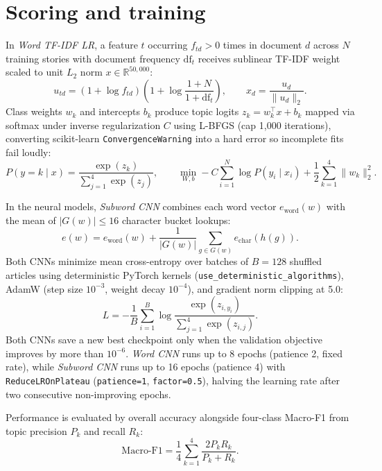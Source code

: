 \section{Scoring and training}
\begingroup
\setlength{\abovedisplayskip}{5pt}
\setlength{\belowdisplayskip}{5pt}
In \textit{Word TF-IDF LR}, a feature $t$ occurring $f_{td} > 0$ times in document $d$ across $N$ training stories with document frequency $\mathrm{df}_t$ receives sublinear TF-IDF weight scaled to unit $L_2$ norm $x \in \mathbb{R}^{50{,}000}$:
\begin{equation}
u_{td} = (1 + \log f_{td})\!\left(1 + \log \frac{1 + N}{1 + \mathrm{df}_t}\right), \qquad x_d = \frac{u_d}{\|u_d\|_2}.
\end{equation}
Class weights $w_k$ and intercepts $b_k$ produce topic logits $z_k = w_k^\top x + b_k$ mapped via softmax under inverse regularization $C$ using L-BFGS (cap 1,000 iterations), converting scikit-learn \texttt{ConvergenceWarning} into a hard error so incomplete fits fail loudly:
\begin{equation}
P(y = k \mid x) = \frac{\exp(z_k)}{\sum_{j=1}^{4}\exp(z_j)}, \qquad \min_{W,b} -C\sum_{i=1}^{N}\log P(y_i \mid x_i) + \frac{1}{2}\sum_{k=1}^{4}\|w_k\|_2^2.
\end{equation}

In the neural models, \textit{Subword CNN} combines each word vector $e_{\mathrm{word}}(w)$ with the mean of $|G(w)| \le 16$ character bucket lookups:
\begin{equation}
e(w) = e_{\mathrm{word}}(w) + \frac{1}{|G(w)|}\sum_{g \in G(w)} e_{\mathrm{char}}(h(g)).
\end{equation}
Both CNNs minimize mean cross-entropy over batches of $B = 128$ shuffled articles using deterministic PyTorch kernels (\texttt{use\_deterministic\_algorithms}), AdamW \citep{adamw} (step size $10^{-3}$, weight decay $10^{-4}$), and gradient norm clipping at 5.0:
\begin{equation}
L = -\frac{1}{B}\sum_{i=1}^{B} \log \frac{\exp(z_{i, y_i})}{\sum_{j=1}^{4}\exp(z_{i,j})}.
\end{equation}
Both CNNs save a new best checkpoint only when the validation objective improves by more than $10^{-6}$. \textit{Word CNN} runs up to 8 epochs (patience 2, fixed rate), while \textit{Subword CNN} runs up to 16 epochs (patience 4) with \texttt{ReduceLROnPlateau} (\texttt{patience=1}, \texttt{factor=0.5}), halving the learning rate after two consecutive non-improving epochs.

Performance is evaluated by overall accuracy alongside four-class Macro-F1 from topic precision $P_k$ and recall $R_k$:
\begin{equation}
\text{Macro-F1} = \frac{1}{4}\sum_{k=1}^{4} \frac{2 P_k R_k}{P_k + R_k}.
\end{equation}
\endgroup

